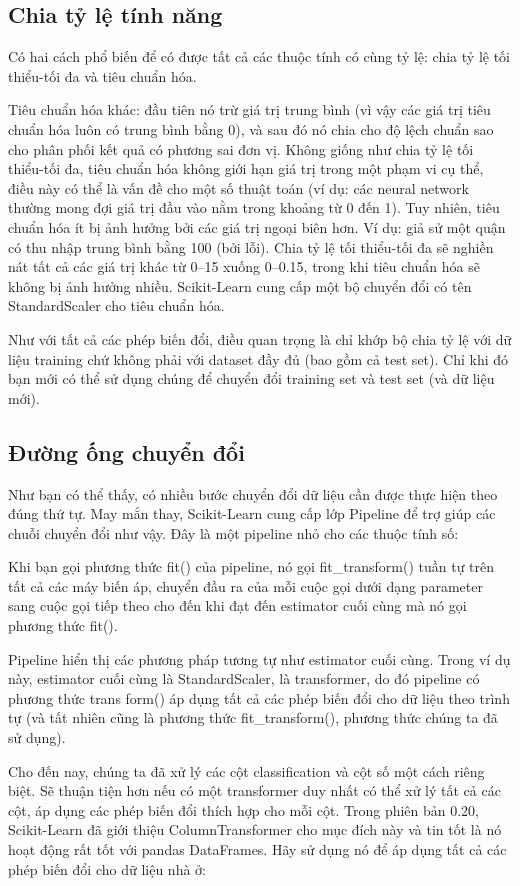 \subsection{Chia tỷ lệ tính năng}

Có hai cách phổ biến để có được tất cả các thuộc tính có cùng tỷ lệ: chia tỷ lệ tối thiểu-tối đa và tiêu chuẩn hóa.

Tiêu chuẩn hóa khác: đầu tiên nó trừ giá trị trung bình (vì vậy các giá trị tiêu chuẩn hóa luôn có trung bình bằng 0), và sau đó nó chia cho độ lệch chuẩn sao cho phân phối kết quả có phương sai đơn vị. Không giống như chia tỷ lệ tối thiểu-tối đa, tiêu chuẩn hóa không giới hạn giá trị trong một phạm vi cụ thể, điều này có thể là vấn đề cho một số thuật toán (ví dụ: các neural network thường mong đợi giá trị đầu vào nằm trong khoảng từ 0 đến 1). Tuy nhiên, tiêu chuẩn hóa ít bị ảnh hưởng bởi các giá trị ngoại biên hơn. Ví dụ: giả sử một quận có thu nhập trung bình bằng 100 (bởi lỗi). Chia tỷ lệ tối thiểu-tối đa sẽ nghiền nát tất cả các giá trị khác từ 0–15 xuống 0–0.15, trong khi tiêu chuẩn hóa sẽ không bị ảnh hưởng nhiều. Scikit-Learn cung cấp một bộ chuyển đổi có tên StandardScaler cho tiêu chuẩn hóa.

Như với tất cả các phép biến đổi, điều quan trọng là chỉ khớp bộ chia tỷ lệ với dữ liệu training chứ không phải với dataset đầy đủ (bao gồm cả test set). Chỉ khi đó bạn mới có thể sử dụng chúng để chuyển đổi training set và test set (và dữ liệu mới).

\subsection{Đường ống chuyển đổi}

Như bạn có thể thấy, có nhiều bước chuyển đổi dữ liệu cần được thực hiện theo đúng thứ tự. May mắn thay, Scikit-Learn cung cấp lớp Pipeline để trợ giúp các chuỗi chuyển đổi như vậy. Đây là một pipeline nhỏ cho các thuộc tính số:

Khi bạn gọi phương thức fit() của pipeline, nó gọi fit\_transform() tuần tự trên tất cả các máy biến áp, chuyển đầu ra của mỗi cuộc gọi dưới dạng parameter sang cuộc gọi tiếp theo cho đến khi đạt đến estimator cuối cùng mà nó gọi phương thức fit().

Pipeline hiển thị các phương pháp tương tự như estimator cuối cùng. Trong ví dụ này, estimator cuối cùng là StandardScaler, là transformer, do đó pipeline có phương thức trans form() áp dụng tất cả các phép biến đổi cho dữ liệu theo trình tự (và tất nhiên cũng là phương thức fit\_transform(), phương thức chúng ta đã sử dụng).

Cho đến nay, chúng ta đã xử lý các cột classification và cột số một cách riêng biệt. Sẽ thuận tiện hơn nếu có một transformer duy nhất có thể xử lý tất cả các cột, áp dụng các phép biến đổi thích hợp cho mỗi cột. Trong phiên bản 0.20, Scikit-Learn đã giới thiệu ColumnTransformer cho mục đích này và tin tốt là nó hoạt động rất tốt với pandas DataFrames. Hãy sử dụng nó để áp dụng tất cả các phép biến đổi cho dữ liệu nhà ở:

